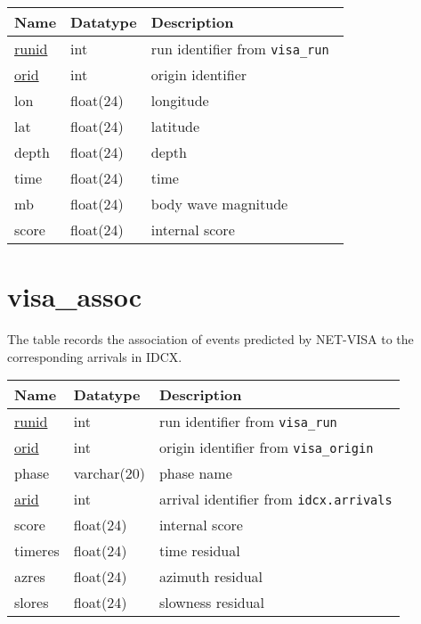 \begin{center}
\begin{tabular}{|l|l|l|}
\hline
\bf{Name} & \bf{Datatype} & \bf{Description} \\
\hline
 \underline{runid}   & int  & run identifier from \tt{visa\_run} \\
 \underline{orid}    & int  & origin identifier \\
 lon     & float(24)  &  longitude \\
 lat     & float(24)  &  latitude \\
 depth   & float(24)  &  depth \\
 time    & float(24)  &  time \\
 mb      & float(24)  &  body wave magnitude \\
 score   & float(24)  &  internal score \\
\hline
\end{tabular}
\end{center}


\section{visa\_assoc}\label{tbl-visa-assoc}

The table records the association of events predicted by NET-VISA to the
corresponding arrivals in IDCX.

\begin{center}
\begin{tabular}{|l|l|l|}
\hline
\bf{Name} & \bf{Datatype} & \bf{Description} \\
\hline
 \underline{runid}  &  int & run identifier from \tt{visa\_run}\\
 \underline{orid}   &  int & origin identifier from \tt{visa\_origin}\\
 phase  &  varchar(20) & phase name \\
 \underline{arid}   &  int & arrival identifier from \tt{idcx.arrivals}\\
 score  &  float(24) & internal score \\
 timeres & float(24) & time residual \\
 azres   & float(24) & azimuth residual \\
 slores  & float(24) & slowness residual \\
\hline
\end{tabular}
\end{center}



